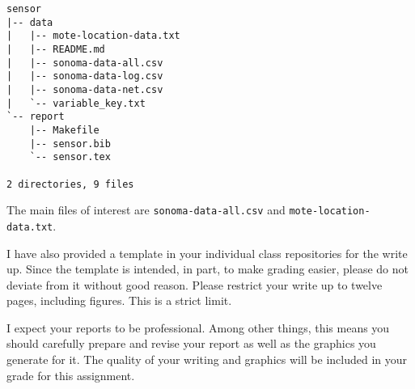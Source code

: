 \documentclass[11pt, oneside]{article}   	%
\begin{document}
\begin{verbatim}
sensor
|-- data
|   |-- mote-location-data.txt
|   |-- README.md
|   |-- sonoma-data-all.csv
|   |-- sonoma-data-log.csv
|   |-- sonoma-data-net.csv
|   `-- variable_key.txt
`-- report
    |-- Makefile
    |-- sensor.bib
    `-- sensor.tex

2 directories, 9 files
\end{verbatim}

The main files of interest are \texttt{sonoma-data-all.csv} and
\texttt{mote-location-data.txt}.

I have also provided a template in your individual class repositories for the
write up. Since the template is intended, in part, to make grading easier,
please do not deviate from it without good reason.  Please restrict your
write up to twelve pages, including figures. This is a strict limit.

I expect your reports to be professional.  Among other things, this means you
should carefully prepare and revise your report as well as the graphics you
generate for it.  The quality of your writing and graphics will be
included in your grade for this assignment.



\end{document}
